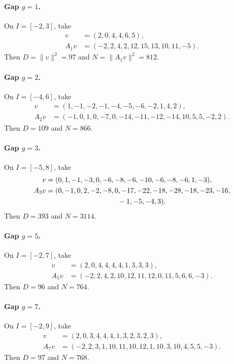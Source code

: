\paragraph{Gap \(g=1\).}
On \(I=[-2,3]\), take
\begin{align*}
 v&=(2,0,4,4,6,5),\\
 A_1v&=(-2,2,4,2,12,15,13,10,11,-5).
\end{align*}
Then \(D=\|v\|^2=97\) and \(N=\|A_1v\|^2=812\).

\paragraph{Gap \(g=2\).}
On \(I=[-4,6]\), take
\begin{align*}
 v&=(1,-1,-2,-1,-4,-5,-6,-2,1,4,2),\\
 A_2v&=(-1,0,1,0,-7,0,-14,-11,-12,-14,10,5,5,-2,2).
\end{align*}
Then \(D=109\) and \(N=866\).

\paragraph{Gap \(g=3\).}
On \(I=[-5,8]\), take
\begin{align*}
 v={}&(0,1,-1,-3,0,-6,-8,-6,-10,-6,-8,-6,1,-3),\\
 A_3v={}&(0,-1,0,2,-2,-8,0,-17,-22,-18,-28,-18,-23,-16,\\
 &\hspace{31mm}-1,-5,-4,3).
\end{align*}
Then \(D=393\) and \(N=3114\).

\paragraph{Gap \(g=5\).}
On \(I=[-2,7]\), take
\begin{align*}
 v&=(2,0,4,4,4,4,1,3,3,3),\\
 A_5v&=(-2,2,4,2,10,12,11,12,0,11,5,6,6,-3).
\end{align*}
Then \(D=96\) and \(N=764\).

\paragraph{Gap \(g=7\).}
On \(I=[-2,9]\), take
\begin{align*}
 v&=(2,0,3,4,4,4,1,3,2,3,2,3),\\
 A_7v&=(-2,2,3,1,10,11,10,12,1,10,3,10,4,5,5,-3).
\end{align*}
Then \(D=97\) and \(N=768\).

